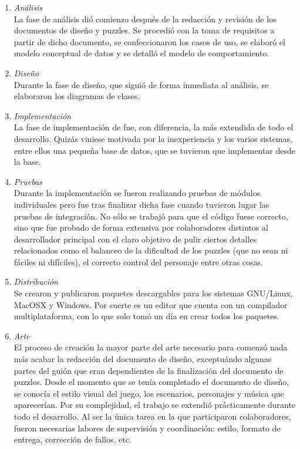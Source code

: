 \begin{enumerate}
\begin{enumerate}
\item \emph{Análisis} \hfill \\
La fase de análisis dió comienzo después de la redacción y revisión de los documentos de diseño y puzzles. Se procedió con la toma de requisitos a partir de dicho documento, se confeccionaron los casos de uso, se elaboró el modelo conceptual de datos y se detalló el modelo de comportamiento.

\item \emph{Diseño} \hfill \\
Durante la fase de diseño, que siguió de forma inmediata al análisis, se elaboraron los diagramas de clases.

\item \emph{Implementación} \hfill \\
La fase de implementación de \nombrejuego{} fue, con diferencia, la más extendida de todo el desarrollo. Quizás viniese motivada por la inexperiencia y los varios sistemas, entre ellos una pequeña base de datos,  que se tuvieron que implementar desde la base.

\item \emph{Pruebas} \hfill \\
Durante la implementación se fueron realizando pruebas de módulos individuales pero fue tras finalizar dicha fase cuando tuvieron lugar las pruebas de integración. No sólo se trabajó para que el código fuese correcto, sino que \nombrejuego{} fue probado de forma extensiva por colaboradores distintos al desarrollador principal con el claro objetivo de pulir ciertos detalles relacionados como el balanceo de la dificultad de los puzzles (que no sean ni fáciles ni difíciles), el correcto control del personaje entre otras cosas.

%

\item \emph{Distribución} \hfill \\
Se crearon y publicaron paquetes descargables para los sistemas GNU/Linux, MacOSX y Windows. Por suerte  es un editor que cuenta con un compilador multiplataforma, con lo que solo tomó un día en crear todos los paquetes.  
%

\item \emph{Arte} \hfill \\
El proceso de creación la mayor parte del arte necesario para \nombrejuego{} comenzó nada más acabar la redacción del documento de diseño, exceptuándo algunas partes del guión que eran dependientes de la finalización del documento de puzzles. Desde el momento que se tenía completado el documento de diseño, se conocía el estilo visual del juego, los escenarios, personajes y música que aparecerían. Por su complejidad, el trabajo se extendió prácticamente durante todo el desarrollo. Al ser la única tarea en la que participaron colaboradores, fueron necesarias labores de supervisión y coordinación: estilo, formato de entrega, corrección de fallos, etc.


\end{enumerate}
\end{enumerate}
